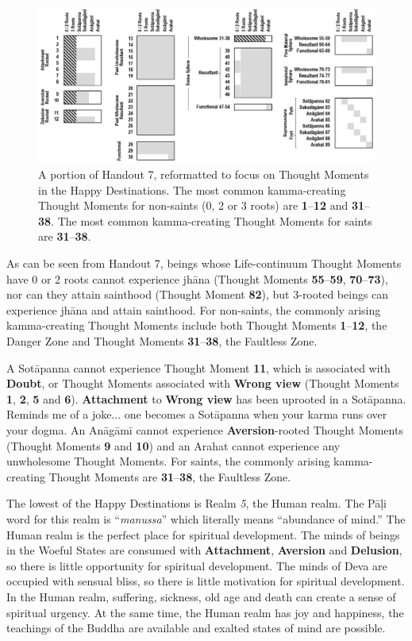 \begin{figure}[h]
\centering
\includegraphics[width=1\linewidth]{./Diagrams/Happy}
\caption{A portion of Handout 7, reformatted to focus on Thought Moments in the Happy Destinations. The most common kamma-creating Thought Moments for non-saints (0, 2 or 3 roots) are \textbf{1}--\textbf{12} and \textbf{31}--\textbf{38}. The most common kamma-creating Thought Moments for saints are \textbf{31}--\textbf{38}.}
\label{fig:Happy}
\end{figure}

As can be seen from Handout 7, beings whose Life-continuum Thought Moments have 0 or 2 roots cannot experience jhāna (Thought Moments \textbf{55}--\textbf{59}, \textbf{70}--\textbf{73}), nor can they attain sainthood (Thought Moment \textbf{82}), but 3-rooted beings can experience jhāna and attain sainthood. For non-saints, the commonly arising kamma-creating Thought Moments include both Thought Moments \textbf{1}--\textbf{12}, the Danger Zone and Thought Moments \textbf{31}--\textbf{38}, the Faultless Zone.

A Sotāpanna cannot experience Thought Moment \textbf{11}, which is associated with \textbf{Doubt}, or Thought Moments associated with \textbf{Wrong view} (Thought Moments \textbf{1}, \textbf{2}, \textbf{5} and \textbf{6}). \textbf{Attachment} to \textbf{Wrong view} has been uprooted in a Sotāpanna. Reminds me of a joke... one becomes a Sotāpanna when your karma runs over your dogma. An Anāgāmī cannot experience \textbf{Aversion}-rooted Thought Moments (Thought Moments \textbf{9} and \textbf{10}) and an Arahat cannot experience any unwholesome Thought Moments. For saints, the commonly arising kamma-creating Thought Moments are \textbf{31}--\textbf{38}, the Faultless Zone.

The lowest of the Happy Destinations is Realm \textit{5}, the Human realm. The Pāḷi word for this realm is “\textit{manussa}” which literally means “abundance of mind.” The Human realm is the perfect place for spiritual development. The minds of beings in the Woeful States are consumed with \textbf{Attachment}, \textbf{Aversion} and \textbf{Delusion}, so there is little opportunity for spiritual development. The minds of Deva are occupied with sensual bliss, so there is little motivation for spiritual development. In the Human realm, suffering, sickness, old age and death can create a sense of spiritual urgency. At the same time, the Human realm has joy and happiness, the teachings of the Buddha are available and exalted states of mind are possible.

